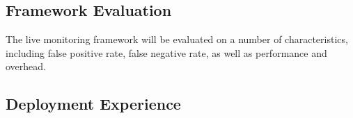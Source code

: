\begin{itemize}
\end{itemize}


\subsection{Framework Evaluation}
The live monitoring framework will be evaluated on a number of characteristics, including false positive rate, false negative rate, as well as performance and overhead.

\subsection{Deployment Experience}
